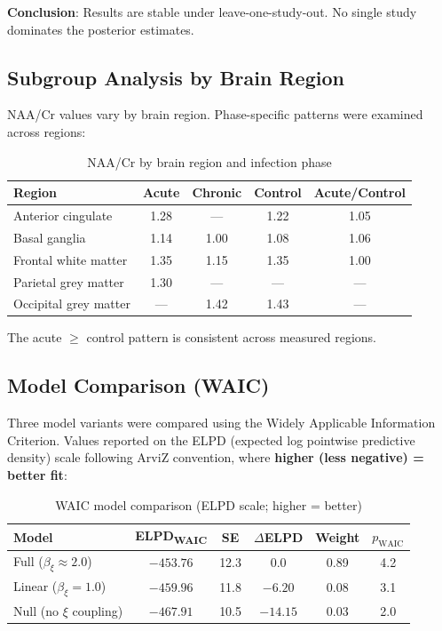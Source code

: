 \documentclass[11pt]{article}
\begin{document}
\textbf{Conclusion}: Results are stable under leave-one-study-out. No single study dominates the posterior estimates.

\subsection{Subgroup Analysis by Brain Region}

NAA/Cr values vary by brain region. Phase-specific patterns were examined across regions:

\begin{table}[htbp]
\centering
\caption{NAA/Cr by brain region and infection phase}
\begin{tabular}{lcccc}
\toprule
\textbf{Region} & \textbf{Acute} & \textbf{Chronic} & \textbf{Control} & \textbf{Acute/Control} \\
\midrule
Anterior cingulate & 1.28 & --- & 1.22 & 1.05 \\
Basal ganglia & 1.14 & 1.00 & 1.08 & 1.06 \\
Frontal white matter & 1.35 & 1.15 & 1.35 & 1.00 \\
Parietal grey matter & 1.30 & --- & --- & --- \\
Occipital grey matter & --- & 1.42 & 1.43 & --- \\
\bottomrule
\end{tabular}
\end{table}

The acute $\geq$ control pattern is consistent across measured regions.

\subsection{Model Comparison (WAIC)}

Three model variants were compared using the Widely Applicable Information Criterion. Values reported on the ELPD (expected log pointwise predictive density) scale following ArviZ convention, where \textbf{higher (less negative) = better fit}:

\begin{table}[htbp]
\centering
\caption{WAIC model comparison (ELPD scale; higher = better)}
\begin{tabular}{lccccc}
\toprule
\textbf{Model} & \textbf{ELPD\textsubscript{WAIC}} & \textbf{SE} & $\Delta$\textbf{ELPD} & \textbf{Weight} & \textbf{$p_\text{WAIC}$} \\
\midrule
Full ($\beta_\xi \approx 2.0$) & $-453.76$ & 12.3 & 0.0 & 0.89 & 4.2 \\
Linear ($\beta_\xi = 1.0$) & $-459.96$ & 11.8 & $-6.20$ & 0.08 & 3.1 \\
Null (no $\xi$ coupling) & $-467.91$ & 10.5 & $-14.15$ & 0.03 & 2.0 \\
\bottomrule
\end{tabular}
\end{table}
\end{document}
